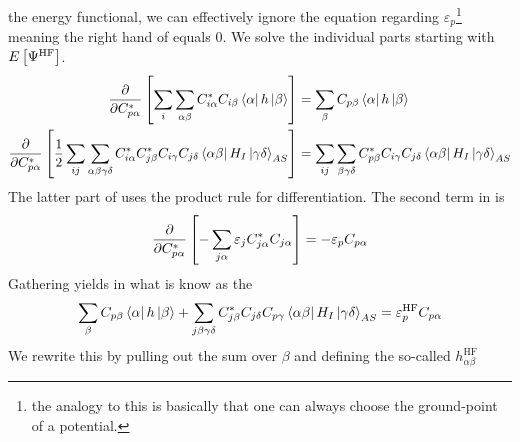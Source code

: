         the energy functional, we can effectively ignore the equation regarding
        $\varepsilon_p$\footnote{the analogy to this is basically that one can
        always choose the ground-point of a potential.} meaning the right hand
        of  equals $0$. We solve the individual parts
        starting with $E\left[\Psi^{\text{HF}}\right]$.
            \begin{equation}
                \begin{aligned}
                    \frac{\mathrm{\partial}}{\mathrm{\partial} C^{*}_{p\alpha}}
                    \left[\sum_i\sum_{\alpha\beta} C^{*}_{i\alpha}C_{i\beta}
                    \bra{\alpha}h\ket{\beta}\right] &=
                    \sum_{\beta}C_{p\beta}\bra{\alpha}h\ket{\beta} \\
                    \frac{\mathrm{\partial}}{\mathrm{\partial} C^{*}_{p\alpha}}
                    \left[\frac{1}{2}\sum_{ij}\sum_{\alpha\beta\gamma\delta}
                    C^{*}_{i\alpha}C^{*}_{j\beta}C_{i\gamma}C_{j\delta}
                    \bra{\alpha\beta}H_I\ket{\gamma\delta}_{AS}\right] &=
                    \sum_{ij}\sum_{\beta\gamma\delta}
                    C^{*}_{p\beta}C_{i\gamma}C_{j\delta}
                    \bra{\alpha\beta}H_I\ket{\gamma\delta}_{AS}
                \end{aligned}
                \label{eq:HFderEFunc}
            \end{equation}
        The latter part of  uses the product rule for
        differentiation. The second term in  is
            \begin{equation}
                \frac{\mathrm{\partial}}{\mathrm{\partial} C^{*}_{p\alpha}} \left[-\sum_{j\alpha}
                \varepsilon_jC^{*}_{j\alpha}C_{j\alpha}\right] =
                -\varepsilon_pC_{p\alpha}
                \label{eq:HFderSecond}
            \end{equation}
        Gathering  yields in what is know as
        the 
            \begin{equation}
                \sum_{\beta}C_{p\beta}\bra{\alpha}h\ket{\beta} +
                \sum_{j\beta\gamma\delta}C^{*}_{j\beta} C_{j\delta}C_{p\gamma}
                \bra{\alpha\beta}H_I\ket{\gamma\delta}_{AS} =
                \varepsilon^{\text{HF}}_pC_{p\alpha}
                \label{eq:HFEquations}
            \end{equation}
        We rewrite this by pulling out the sum over $\beta$ and defining the
        so-called  $h^{\text{HF}}_{\alpha\beta}$
